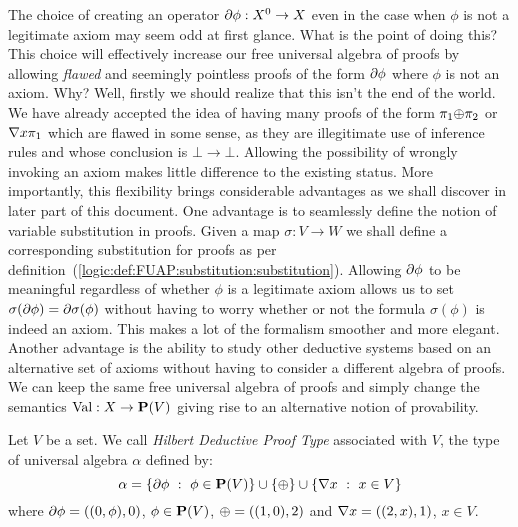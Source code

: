 The choice of creating an operator $\mbox{$\partial$}\phi:X^{0}\to X$ even in the
case when $\phi$ is not a legitimate axiom may seem odd at first
glance. What is the point of doing this? This choice will
effectively increase our free universal algebra of proofs by
allowing {\em flawed} and seemingly pointless proofs of the form
$\mbox{$\partial$}\phi$ where $\phi$ is not an axiom. Why? Well, firstly we
should realize that this isn't the end of the world. We have already
accepted the idea of having many proofs of the form
$\pi_{1}\mbox{$\oplus$}\pi_{2}$ or $\mbox{$\nabla$} x\pi_{1}$ which are flawed in some
sense, as they are illegitimate use of inference rules and whose
conclusion is $\bot\to\bot$. Allowing the possibility of wrongly
invoking an axiom makes little difference to the existing status.
More importantly, this flexibility brings considerable advantages as
we shall discover in later part of this document. One advantage is
to seamlessly define the notion of variable substitution in proofs.
Given a map $\sigma:V\to W$ we shall define a corresponding
substitution for proofs as per
definition~(\ref{logic:def:FUAP:substitution:substitution}).
Allowing $\mbox{$\partial$}\phi$ to be meaningful regardless of whether $\phi$ is
a legitimate axiom allows us to set
$\sigma(\mbox{$\partial$}\phi)=\mbox{$\partial$}\sigma(\phi)$ without having to worry whether
or not the formula $\sigma(\phi)$ is indeed an axiom. This makes a
lot of the formalism smoother and more elegant. Another advantage is
the ability to study other deductive systems based on an alternative
set of axioms without having to consider a different algebra of
proofs. We can keep the same free universal algebra of proofs and
simply change the semantics $\mbox{\rm Val}:X\to\mbox{${\bf P}(V)$}$ giving rise to an
alternative notion of provability.

\begin{defin}\label{logic:def:FOPL:proof:type}
Let $V$ be a set. We call {\em Hilbert Deductive Proof Type}
associated with $V$, the type of universal algebra $\alpha$ defined
by:
    \[
    \alpha = \{\axi\phi\ :\ \phi\in\pv\}\cup \{\pon\}\cup\{\gen x\ :\ x\in V\}
    \]
where $\mbox{$\partial$}\phi=((0,\phi),0)$, $\phi\in\mbox{${\bf P}(V)$}$, $\mbox{$\oplus$} = ((1,0),2)$ and
$\mbox{$\nabla$} x = ((2,x),1)$, $x\in V$.
\end{defin}

